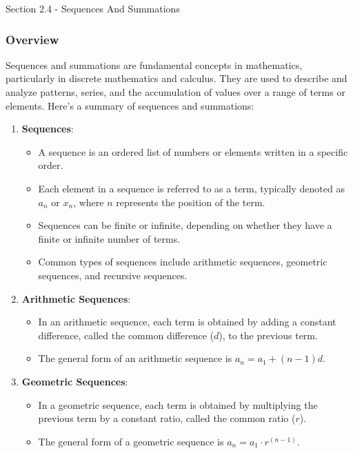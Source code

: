 \begin{notes}{Section 2.4 - Sequences And Summations}
    \subsubsection*{Overview}

    Sequences and summations are fundamental concepts in mathematics, particularly in discrete mathematics and calculus. They are used to describe and analyze patterns, series, and the accumulation 
    of values over a range of terms or elements. Here's a summary of sequences and summations:

    \begin{enumerate}[label=\arabic*.]
        \item \textbf{Sequences}:
        \begin{itemize}
            \item A sequence is an ordered list of numbers or elements written in a specific order.
            \item Each element in a sequence is referred to as a term, typically denoted as $a_n$ or $x_n$, where $n$ represents the position of the term.
            \item Sequences can be finite or infinite, depending on whether they have a finite or infinite number of terms.
            \item Common types of sequences include arithmetic sequences, geometric sequences, and recursive sequences.
        \end{itemize}
        
        \item \textbf{Arithmetic Sequences}:
        \begin{itemize}
            \item In an arithmetic sequence, each term is obtained by adding a constant difference, called the common difference ($d$), to the previous term.
            \item The general form of an arithmetic sequence is $a_n = a_1 + (n - 1)d$.
        \end{itemize}
        
        \item \textbf{Geometric Sequences}:
        \begin{itemize}
            \item In a geometric sequence, each term is obtained by multiplying the previous term by a constant ratio, called the common ratio ($r$).
            \item The general form of a geometric sequence is $a_n = a_1 \cdot r^{(n - 1)}$.
        \end{itemize}
        

\end{enumerate}
\end{notes}
